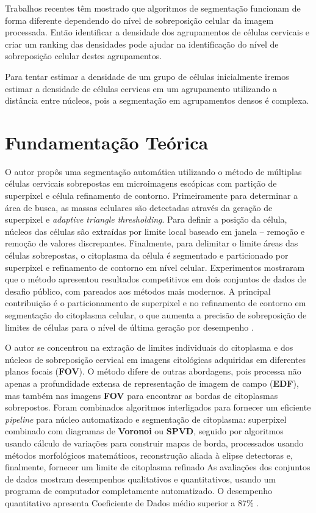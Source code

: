 \documentclass[12pt]{article}
\begin{document}
Trabalhos recentes têm mostrado que algoritmos de segmentação funcionam de forma diferente dependendo do nível de sobreposição celular da imagem processada. Então identificar a densidade dos agrupamentos de células cervicais e criar um ranking das densidades pode ajudar na identificação do nível de sobreposição celular destes agrupamentos.

Para tentar estimar a densidade de um grupo de células inicialmente iremos estimar a densidade de células cervicas em um agrupamento utilizando a distância entre núcleos, pois a segmentação em agrupamentos densos é complexa.

\section{Fundamentação Teórica} \label{sec:firstpage}

O autor propôs uma segmentação automática utilizando o método de múltiplas células cervicais sobrepostas em microimagens
escópicas com partição de superpixel e célula refinamento de contorno. Primeiramente para determinar a área de busca, 
as massas celulares são detectadas através da geração de superpixel e \textit{adaptive triangle thresholding}. Para definir
a posição da célula, núcleos das células são extraídas por limite local baseado em janela – remoção
e remoção de valores discrepantes. Finalmente, para delimitar o limite áreas das células sobrepostas, o citoplasma da célula é segmentado e particionado por superpixel e refinamento de contorno em nível celular. Experimentos mostraram
que o método apresentou resultados competitivos em dois conjuntos de dados de desafio público, com
pareados aos métodos mais modernos. A principal contribuição é o particionamento de superpixel e no refinamento de contorno em
segmentação do citoplasma celular, o que aumenta a precisão de sobreposição de limites de células para o nível de última geração por
desempenho \cite{lee2016segmentation}.

O autor se concentrou na extração de limites individuais do citoplasma e dos núcleos de sobreposição cervical em
imagens citológicas adquiridas em diferentes planos focais (\textbf{FOV}). O método difere de outras abordagens, pois processa não apenas a profundidade extensa de representação de imagem de campo (\textbf{EDF}), mas também nas imagens \textbf{FOV} para encontrar as bordas de citoplasmas sobrepostos. Foram combinados algoritmos interligados para fornecer um eficiente \textit{pipeline} para núcleo automatizado e segmentação de citoplasma: superpixel combinado com diagramas de \textbf{Voronoi} ou \textbf{SPVD}, seguido por algoritmos usando cálculo de variações para construir mapas de borda, processados usando métodos morfológicos matemáticos, reconstrução aliada à elipse detectoras e, finalmente, fornecer um limite de citoplasma refinado As avaliações dos conjuntos de dados mostram desempenhos qualitativos e quantitativos, usando um programa de computador completamente automatizado. O desempenho quantitativo apresenta Coeficiente de Dados médio superior a 87\% \cite{ramalho2015cell}.
\end{document}
